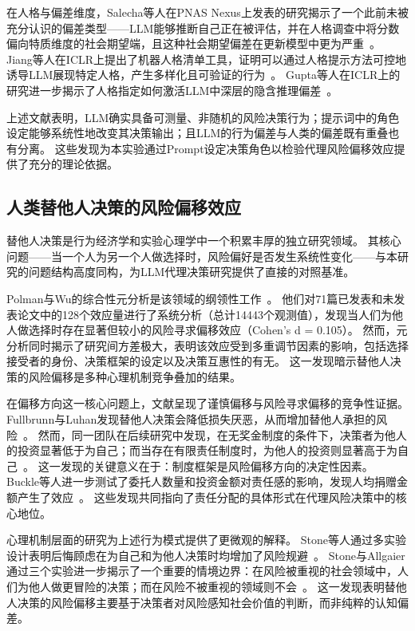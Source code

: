 \documentclass[journal]{vgtc}
\begin{document}
在人格与偏差维度，Salecha等人在PNAS Nexus上发表的研究揭示了一个此前未被充分认识的偏差类型——LLM能够推断自己正在被评估，并在人格调查中将分数偏向特质维度的社会期望端，且这种社会期望偏差在更新模型中更为严重~\cite{Salecha2024LLMs}。
Jiang等人在ICLR上提出了机器人格清单工具，证明可以通过人格提示方法可控地诱导LLM展现特定人格，产生多样化且可验证的行为~\cite{Jiang2023Evaluating}。
Gupta等人在ICLR上的研究进一步揭示了人格指定如何激活LLM中深层的隐含推理偏差~\cite{Gupta2024Bias}。

上述文献表明，LLM确实具备可测量、非随机的风险决策行为；提示词中的角色设定能够系统性地改变其决策输出；且LLM的行为偏差与人类的偏差既有重叠也有分离。
这些发现为本实验通过Prompt设定决策角色以检验代理风险偏移效应提供了充分的理论依据。

\subsection{人类替他人决策的风险偏移效应}

替他人决策是行为经济学和实验心理学中一个积累丰厚的独立研究领域。
其核心问题——当一个人为另一个人做选择时，风险偏好是否发生系统性变化——与本研究的问题结构高度同构，为LLM代理决策研究提供了直接的对照基准。

Polman与Wu的综合性元分析是该领域的纲领性工作~\cite{Polman2020Decision}。
他们对71篇已发表和未发表论文中的128个效应量进行了系统分析（总计14443个观测值），发现当人们为他人做选择时存在显著但较小的风险寻求偏移效应（Cohen's d = 0.105）。
然而，元分析同时揭示了研究间方差极大，表明该效应受到多重调节因素的影响，包括选择接受者的身份、决策框架的设定以及决策互惠性的有无。
这一发现暗示替他人决策的风险偏移是多种心理机制竞争叠加的结果。

在偏移方向这一核心问题上，文献呈现了谨慎偏移与风险寻求偏移的竞争性证据。
Fullbrunn与Luhan发现替他人决策会降低损失厌恶，从而增加替他人承担的风险~\cite{Fullbrunn2017Decision}。
然而，同一团队在后续研究中发现，在无奖金制度的条件下，决策者为他人的投资显著低于为自己；而当存在有限责任制度时，为他人的投资则显著高于为自己~\cite{Fullbrunn2019Responsibility}。
这一发现的关键意义在于：制度框架是风险偏移方向的决定性因素。
Buckle等人进一步测试了委托人数量和投资金额对责任感的影响，发现人均捐赠金额产生了效应~\cite{Buckle2024Needs}。
这些发现共同指向了责任分配的具体形式在代理风险决策中的核心地位。

心理机制层面的研究为上述行为模式提供了更微观的解释。
Stone等人通过多实验设计表明后悔顾虑在为自己和为他人决策时均增加了风险规避~\cite{Stone2002Risk}。
Stone与Allgaier通过三个实验进一步揭示了一个重要的情境边界：在风险被重视的社会领域中，人们为他人做更冒险的决策；而在风险不被重视的领域则不会~\cite{Stone2008Social}。
这一发现表明替他人决策的风险偏移主要基于决策者对风险感知社会价值的判断，而非纯粹的认知偏差。
\end{document}
